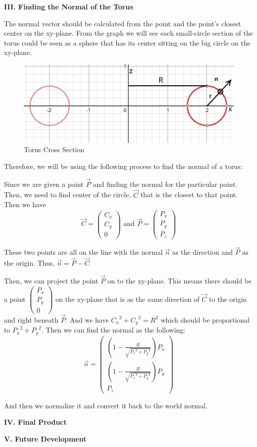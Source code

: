 \documentclass[a4paper,12pt]{report}
\begin{document}
\textbf{III. Finding the Normal of the Torus}

The normal vector should be calculated from the point and the point's closest center on the xy-plane. From the graph we will see each small-circle section of the torus could be seen as a sphere that has its center sitting on the big circle on the xy-plane. 
\begin{figure}[h]
\centering
\includegraphics[scale=0.75]{./Pic/Torus5.png}
\caption{Torus Cross Section}
\end{figure}
Therefore, we will be using the following process to find the normal of a torus:

Since we are given a point $\overrightarrow{P}$ and finding the normal for the particular point. Then, we need to find center of the circle, $\overrightarrow{C}$ that is the closest to that point. Then we have  \[\overrightarrow{C}=\begin{pmatrix}
C_x\\
C_y\\
0
\end{pmatrix}\text{ and }\overrightarrow{P}=\begin{pmatrix}
P_x\\
P_y\\
P_z
\end{pmatrix}\]

These two points are all on the line with the normal $\overrightarrow{n}$ as the direction and $\overrightarrow{P}$ as the origin. Thus, $\overrightarrow{n}=\overrightarrow{P}-\overrightarrow{C}$

Then, we can project the point $\overrightarrow{P}$ on to the xy-plane. This means there should be a point $\begin{pmatrix}
P_x\\
P_y\\
0
\end{pmatrix}$ on the xy-plane that is as the same direction of $\overrightarrow{C}$ to the origin and right beneath $\overrightarrow{P}$. And we have ${C_x}^2+{C_y}^2=R^2$ which should be proportional to ${P_x}^2+{P_y}^2$. Then we can find the normal as the following:
\[\overrightarrow{n}=\begin{pmatrix}
(1-\frac{R}{\sqrt{{P_x}^2+{P_y}^2}})P_x\\
(1-\frac{R}{\sqrt{{P_x}^2+{P_y}^2}})P_y\\
P_z
\end{pmatrix}\]

And then we normalize it and convert it back to the world normal. 

\textbf{IV. Final Product}

\textbf{V. Future Development}
\end{document}
